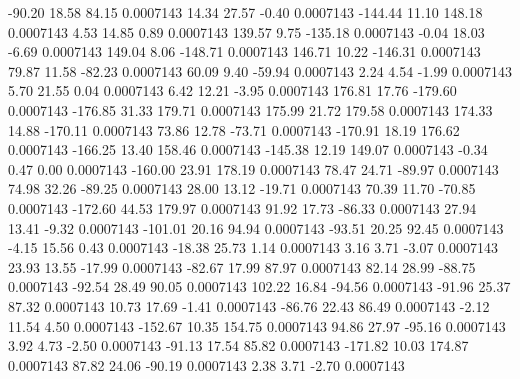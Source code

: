       -90.20       18.58       84.15     0.0007143
       14.34       27.57       -0.40     0.0007143
     -144.44       11.10      148.18     0.0007143
        4.53       14.85        0.89     0.0007143
      139.57        9.75     -135.18     0.0007143
       -0.04       18.03       -6.69     0.0007143
      149.04        8.06     -148.71     0.0007143
      146.71       10.22     -146.31     0.0007143
       79.87       11.58      -82.23     0.0007143
       60.09        9.40      -59.94     0.0007143
        2.24        4.54       -1.99     0.0007143
        5.70       21.55        0.04     0.0007143
        6.42       12.21       -3.95     0.0007143
      176.81       17.76     -179.60     0.0007143
     -176.85       31.33      179.71     0.0007143
      175.99       21.72      179.58     0.0007143
      174.33       14.88     -170.11     0.0007143
       73.86       12.78      -73.71     0.0007143
     -170.91       18.19      176.62     0.0007143
     -166.25       13.40      158.46     0.0007143
     -145.38       12.19      149.07     0.0007143
       -0.34        0.47        0.00     0.0007143
     -160.00       23.91      178.19     0.0007143
       78.47       24.71      -89.97     0.0007143
       74.98       32.26      -89.25     0.0007143
       28.00       13.12      -19.71     0.0007143
       70.39       11.70      -70.85     0.0007143
     -172.60       44.53      179.97     0.0007143
       91.92       17.73      -86.33     0.0007143
       27.94       13.41       -9.32     0.0007143
     -101.01       20.16       94.94     0.0007143
      -93.51       20.25       92.45     0.0007143
       -4.15       15.56        0.43     0.0007143
      -18.38       25.73        1.14     0.0007143
        3.16        3.71       -3.07     0.0007143
       23.93       13.55      -17.99     0.0007143
      -82.67       17.99       87.97     0.0007143
       82.14       28.99      -88.75     0.0007143
      -92.54       28.49       90.05     0.0007143
      102.22       16.84      -94.56     0.0007143
      -91.96       25.37       87.32     0.0007143
       10.73       17.69       -1.41     0.0007143
      -86.76       22.43       86.49     0.0007143
       -2.12       11.54        4.50     0.0007143
     -152.67       10.35      154.75     0.0007143
       94.86       27.97      -95.16     0.0007143
        3.92        4.73       -2.50     0.0007143
      -91.13       17.54       85.82     0.0007143
     -171.82       10.03      174.87     0.0007143
       87.82       24.06      -90.19     0.0007143
        2.38        3.71       -2.70     0.0007143
